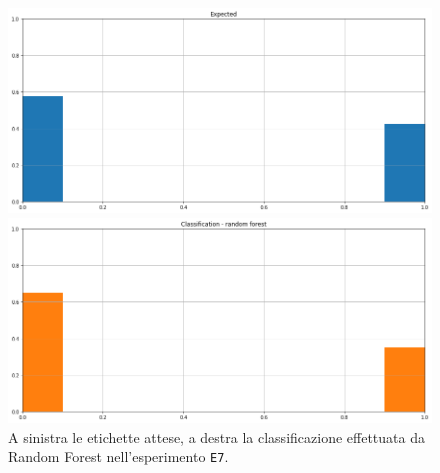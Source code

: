 \documentclass[12pt]{report}
\theoremstyle{definition}
\begin{document}
\begin{figure}
\centering
    \begin{minipage}{0.48\textwidth}
        \includegraphics[width=\linewidth]{images/experiment_kaggle/expected_classification.png}
    \end{minipage}
    \begin{minipage}{0.48\textwidth}
        \includegraphics[width=\linewidth]{images/experiment_kaggle/prediction_classification_rf.png}
    \end{minipage}
    \caption{A sinistra le etichette attese, a destra la classificazione effettuata da Random Forest nell'esperimento \texttt{E7}.}
    \label{rf_class_exp7}
\end{figure} 
\end{document}

